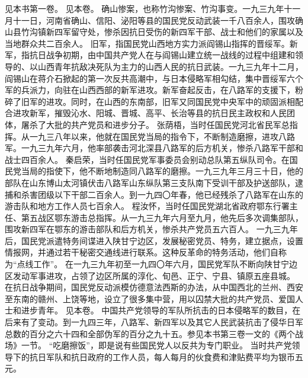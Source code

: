 \begin{maonote}
见本书第一卷。
见本卷。
确山惨案，也称竹沟惨案、竹沟事变。一九三九年十一月十一日，河南省确山、信阳、泌阳等县的国民党反动武装一千八百余人，围攻确山县竹沟镇新四军留守处，惨杀因抗日受伤的新四军干部、战士和他们的家属以及当地群众共二百余人。
旧军，指国民党山西地方实力派阎锡山指挥的晋绥军。新军，指抗日战争初期，由中国共产党人在与阎锡山建立统一战线的过程中组建和领导的、以山西青年抗敌决死队为主力的山西人民的抗日武装。一九三九年十二月，阎锡山在蒋介石掀起的第一次反共高潮中，与日本侵略军相勾结，集中晋绥军六个军的兵派力，向驻在山西西部的新军进攻。新军奋起反击，在八路军的支援下，粉碎了旧军的进攻。同时，在山西的东南部，旧军又同国民党中央军中的顽固派相配合进攻新军，摧毁沁水、阳城、晋城、高平、长治等县的抗日民主政权和人民团体，屠杀了大批的共产党员和进步分子。
张荫梧，当时任国民党河北省民军总指挥。从一九三八年以来，他就在国民党当局的指令下，不断制造磨擦，进攻八路军。一九三九年六月，他率部袭击河北深县八路军的后方机关，惨杀八路军干部和战士四百余人。
秦启荣，当时任国民党军事委员会别动总队第五纵队司令。在国民党当局的指使下，他不断地制造同八路军的磨擦。一九三九年三月三十日，他的部队在山东博山太河镇伏击八路军山东纵队第三支队南下受训干部及护送部队，逮捕和杀害团级以下干部二百余人。到一九四〇年春，他已经残杀了八路军在山东的游击队和地方工作人员七百余人。
程汝怀，当时任国民党湖北省政府鄂东行署主任、第五战区鄂东游击总指挥。从一九三九年六月至九月，他先后多次调集部队，围攻新四军在鄂东的游击部队和后方机关，惨杀共产党员五六百人。
一九三九年后，国民党派遣特务间谍进入陕甘宁边区，发展秘密党员、特务，建立据点，设置情报网，并通过若干秘密交通线进行联系。这种反革命的特务活动，他们自称为“点线工作”。
在一九三九年初至一九四〇年六月，国民党军队不断向陕甘宁边区发动军事进攻，占领了边区所属的淳化、旬邑、正宁、宁县、镇原五座县城。
在抗日战争期间，国民党反动派模仿德意法西斯的办法，从中国西北的兰州、西安至东南的赣州、上饶等地，设立了很多集中营，用以囚禁大批的共产党员、爱国人士和进步青年。
见本卷。
中国共产党领导的军队所抗击的日本侵略军的数目，在后来有了变动。到一九四三年，八路军、新四军以及其它人民武装抗击了侵华日军总数的百分之六十四和全部伪军的百分之九十五。参见本书第三卷一文的《两个战场》一节。
“吃磨擦饭”，即是说有些国民党人以反共为专门职业。
当时共产党领导下的抗日军队和抗日政府的工作人员，每人每月的伙食费和津贴费平均为银币五元。
\end{maonote}
